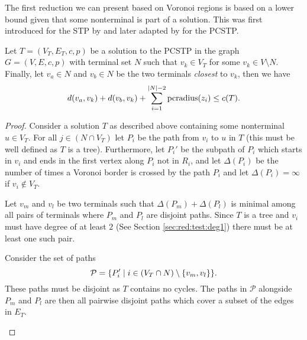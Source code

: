 The first reduction we can present based on Voronoi regions is based on a lower bound given that some nonterminal is
part of a solution. This was first introduced for the STP by \citet{polzin2001improved} and later adapted by
\citet{rehfeldt2016reduction} for the PCSTP.

\begin{theorem}\label{thm:vor:1}
  Let $T = (V_T, E_T, c, p)$ be a solution to the PCSTP in the graph $G = (V, E, c, p)$ with terminal set $N$ such that
  $v_k \in V_T$ for some $v_k \in V \setminus N$. Finally, let $v_a \in N$ and $v_b \in N$ be the two terminals \textit{closest}
  to $v_k$, then we have
  $$d(v_a, v_k) + d(v_b, v_k) + \sum_{i = 1}^{|N| - 2} \operatorname{pcradius}(z_i) \leq c(T)\mathnormal{.}$$
\end{theorem}
\begin{proof}
  Consider a solution $T$ as described above containing some nonterminal $u \in V_T$.
  For all $j \in (N \cap V_T)$ let $P_i$ be the
  path from $v_i$ to $u$ in $T$ (this must be well defined as $T$ is a tree). Furthermore,
  let $P_i'$ be the subpath of $P_i$ which starts in $v_i$ and ends in the first vertex along
  $P_i$ not in $R_i$, and
  let $\Delta(P_i)$ be the number of times a Voronoi border is crossed by the path $P_i$ and
  let $\Delta(P_i) = \infty$ if $v_i \not\in V_T$.

  Let $v_m$ and $v_l$ be two terminals such that $\Delta(P_m) + \Delta(P_l)$ is minimal among
  all pairs of terminals where $P_m$ and $P_l$ are disjoint paths. Since $T$ is a tree and
  $v_i$ must have degree of at least $2$ (See Section \ref{sec:red:test:deg1}) there must
  be at least one such pair.

  Consider the set of paths
  $$\mathcal{P} = \{P_i' \mid i \in (V_T \cap N) \setminus \{v_m, v_l\} \}
  \mathnormal{.}$$
  These paths must be disjoint as $T$ contains no cycles. The paths in $\mathcal{P}$
  alongside $P_m$ and $P_l$ are then all pairwise disjoint paths which cover a subset of the
  edges
  in $E_T$.

 \begin{figure}[h!]
     \centering
\end{figure}
\end{proof}
